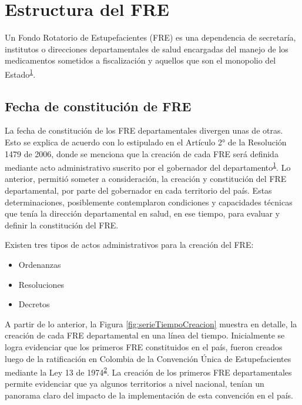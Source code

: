 \documentclass[
]{book}
\providecommand{\tightlist}{%
  \setlength{\itemsep}{0pt}\setlength{\parskip}{0pt}}
\begin{document}
\hypertarget{estructura-del-fre}{%
\chapter{Estructura del FRE}\label{estructura-del-fre}}


Un Fondo Rotatorio de Estupefacientes (FRE) es una dependencia de secretaría, institutos o direcciones departamentales de salud encargadas del manejo de los medicamentos sometidos a fiscalización y aquellos que son el monopolio del Estado\textsuperscript{\protect\hyperlink{ref-MSPS1479-2006}{1}}.

\hypertarget{fecha-de-constituciuxf3n-de-fre}{%
\section{Fecha de constitución de FRE}\label{fecha-de-constituciuxf3n-de-fre}}

La fecha de constitución de los FRE departamentales divergen unas de otras. Esto se explica de acuerdo con lo estipulado en el Artículo 2° de la Resolución 1479 de 2006, donde se menciona que la creación de cada FRE será definida mediante acto administrativo suscrito por el gobernador del departamento\textsuperscript{\protect\hyperlink{ref-MSPS1479-2006}{1}}. Lo anterior, permitió someter a consideración, la creación y constitución del FRE departamental, por parte del gobernador en cada territorio del país. Estas determinaciones, posiblemente contemplaron condiciones y capacidades técnicas que tenía la dirección departamental en salud, en ese tiempo, para evaluar y definir la constitución del FRE.

Existen tres tipos de actos administrativos para la creación del FRE:

\begin{itemize}
\tightlist
\item
  Ordenanzas
\item
  Resoluciones
\item
  Decretos
\end{itemize}

A partir de lo anterior, la Figura \ref{fig:serieTiempoCreacion} muestra en detalle, la creación de cada FRE departamental en una línea del tiempo. Inicialmente se logra evidenciar que los primeros FRE constituidos en el país, fueron creados luego de la ratificación en Colombia de la Convención Única de Estupefacientes mediante la Ley 13 de 1974\textsuperscript{\protect\hyperlink{ref-CongresodelaRepublica1974}{2}}. La creación de los primeros FRE departamentales permite evidenciar que ya algunos territorios a nivel nacional, tenían un panorama claro del impacto de la implementación de esta convención en el país.
\end{document}
